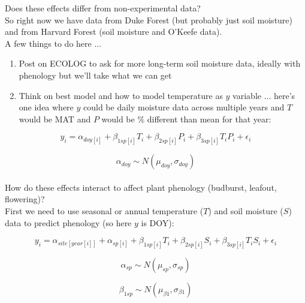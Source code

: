 \documentclass[12pt,a4paper]{article}
\begin{document}
 Does these effects differ from non-experimental data?\\

\noindent  So right now we have data from Duke Forest (but probably just soil moisture) and from Harvard Forest (soil moisture and O'Keefe data).\\

\noindent A few things to do here ...
\begin{enumerate}
\item Post on ECOLOG to ask for more long-term soil moisture data, ideally with phenology but we'll take what we can get
\item Think on best model and how to model temperature as $y$ variable ... here's one idea where $y$ could be daily moisture data across multiple years and $T$ would be MAT and $P$ would be \% different than mean for that year:
\end{enumerate}

\begin{equation}
y_{i}=\alpha_{doy[i]}+\beta_{1 sp[i]}T_i+\beta_{2 sp[i]}P_i+\beta_{3 sp[i]}T_iP_i+\epsilon_{i}
\end{equation}

\begin{equation}
\alpha_{doy} \sim N(\mu_{doy}, \sigma_{doy})
\end{equation}
\vspace{2ex}\\

 How do these effects interact to affect plant phenology (budburst, leafout, flowering)?\\

\noindent First we need to use seasonal or annual temperature ($T$) and soil moisture ($S$) data to predict phenology (so here $y$ is DOY):

\begin{equation}
y_{i}=\alpha_{site[year[i]]}+ \alpha_{sp[i]}+\beta_{1 sp[i]}T_i+\beta_{2 sp[i]}S_i+\beta_{3 sp[i]}T_iS_i+\epsilon_{i}
\end{equation}

\begin{equation}
\alpha_{sp} \sim N(\mu_{sp}, \sigma_{sp})
\end{equation}

\begin{equation}
\beta_{1 sp} \sim N(\mu_{\beta1}, \sigma_{\beta1})
\end{equation}
\end{document}
